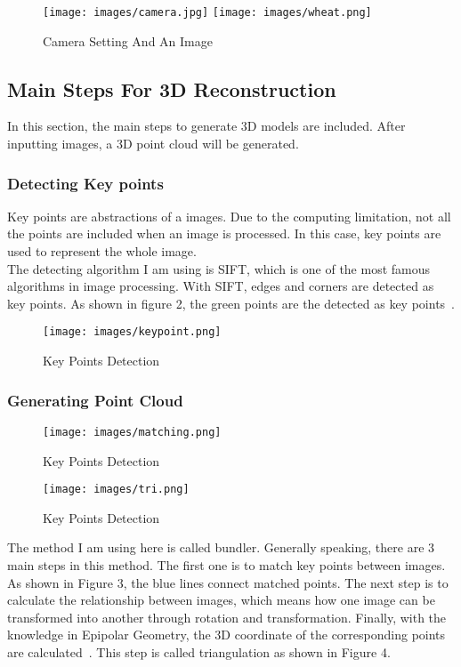 \documentclass[a4paper]{article}
\begin{document}
\begin{figure}[htbp]
   \centering
   \texttt{[image: images/camera.jpg]}
   \texttt{[image: images/wheat.png]}
   \caption{Camera Setting And An Image}
\end{figure}

\subsection{Main Steps For 3D Reconstruction}
In this section, the main steps to generate 3D models are included. After inputting images, a 3D point cloud will be generated.
\subsubsection{Detecting Key points}
Key points are abstractions of a images. Due to the computing limitation, not all the points are included when an image is processed. In this case, key points are used to represent the whole image. \\
The detecting algorithm I am using is SIFT, which is one of the most famous algorithms in image processing. With SIFT, edges and corners are detected as key points. As shown in figure 2, the green points are the detected as key points~\cite{2}.\\

\begin{figure}[H]
    \centering
    \texttt{[image: images/keypoint.png]}
    \caption{Key Points Detection}
\end{figure}

\subsubsection{Generating Point Cloud}

\begin{figure}[H]
    \centering
    \texttt{[image: images/matching.png]}
    \caption{Key Points Detection}
\end{figure}

\begin{figure}[H]
    \centering
    \texttt{[image: images/tri.png]}
    \caption{Key Points Detection}
\end{figure}

The method I am using here is called bundler. Generally speaking, there are 3 main steps in this method. The first one is to match key points between images. As shown in Figure 3, the blue lines connect matched points. The next step is to calculate the relationship between images, which means how one image can be transformed into another through rotation and transformation. Finally, with the knowledge in Epipolar Geometry, the 3D coordinate of the corresponding  points are calculated~\cite{3}. This step is called triangulation as shown in Figure 4.\\
\end{document}

